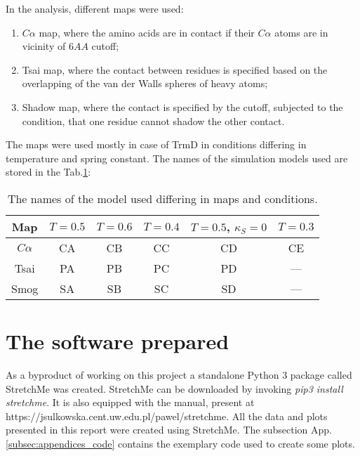 In the analysis, different maps were used:
\begin{enumerate}
    \item $C\alpha$ map, where the amino acids are in contact if their $C\alpha$ atoms are in vicinity of $6AA$ cutoff;
    \item Tsai map, where the contact between residues is specified based on the overlapping of the van der Walls spheres of heavy atoms;
    \item Shadow map, where the contact is specified by the cutoff, subjected to the condition, that one residue cannot shadow the other contact.
\end{enumerate}

The maps were used mostly in case of TrmD in conditions differing in temperature and spring constant. The names of the simulation models used are stored in the Tab.\ref{tab:methods_maps}:

\begin{table}
    \begin{tabular}{c|c|c|c|c|c}
        Map & $T=0.5$ & $T=0.6$ & $T=0.4$ & $T=0.5$, $\kappa_S=0$ & $T=0.3$ \\\hline
        $C\alpha$ & CA & CB & CC & CD & CE\\\hline
        Tsai & PA & PB & PC & PD & ---\\\hline
        Smog & SA & SB & SC & SD & ---\\\hline
    \end{tabular}
    \caption{The names of the model used differing in maps and conditions.}
    \label{tab:methods_maps}
\end{table}

\section{The software prepared}
\label{sec:methods_software}
As a byproduct of working on this project a standalone Python 3 package called StretchMe was created.
StretchMe can be downloaded by invoking \textit{pip3 install stretchme}.
It is also equipped with the manual, present at https://jsulkowska.cent.uw.edu.pl/pawel/stretchme.
All the data and plots presented in this report were created using StretchMe.
The subsection App.\ref{subsec:appendices_code} contains the exemplary code used to create some plots.